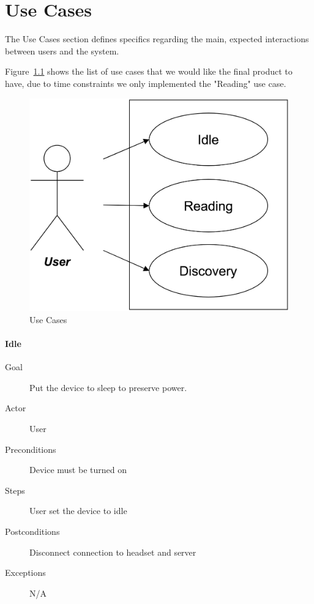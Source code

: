 \chapter{Use Cases}
The Use Cases section defines specifics regarding the main, expected interactions between users and the system.

Figure~\ref{useCase} shows the list of use cases that we would like the final product to have, due to time constraints we only implemented the "Reading" use case.

\begin{figure}
	
	\centering
	\includegraphics[scale = 0.15]{useCase.png}
    
    \caption{Use Cases}
    \label{useCase}
\end{figure}

\pagebreak

\subsubsection{Idle}
\begin{description}
\item [Goal] Put the device to sleep to preserve power.
\item [Actor] User
\item [Preconditions] Device must be turned on
\item [Steps] User set the device to idle
\item [Postconditions] Disconnect connection to headset and server
\item [Exceptions] N/A
\end{description}


